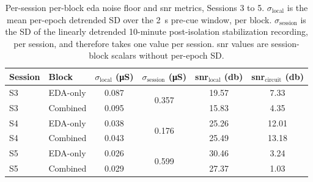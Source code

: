 \begin{table}[!htbp]
  \centering
  \caption{Per-session per-block \gls{eda} noise floor and \gls{snr} metrics, Sessions 3 to 5. $\sigma_{\text{local}}$ is the mean per-epoch detrended SD over the \SI{2}{\second} pre-cue window, per block. $\sigma_{\text{session}}$ is the SD of the linearly detrended 10-minute post-isolation stabilization recording, per session, and therefore takes one value per session. \gls{snr} values are session-block scalars without per-epoch SD.}
  \label{tab:q7-eda-noise-snr}
  \begin{tabular}{l l c c c c}
    \toprule
    \textbf{Session} & \textbf{Block} & \boldmath$\sigma_{\text{local}}$ \textbf{(\si{\micro\siemens})} & \boldmath$\sigma_{\text{session}}$ \textbf{(\si{\micro\siemens})} & \textbf{\gls{snr}$_{\text{local}}$ (\si{\decibel})} & \textbf{\gls{snr}$_{\text{circuit}}$ (\si{\decibel})} \\
    \midrule
    S3 & EDA-only & \num{0.087} & \multirow{2}{*}{\num{0.357}} & \num{19.57} & \num{7.33}  \\
    S3 & Combined & \num{0.095} &                                & \num{15.83} & \num{4.35}  \\
    \addlinespace
    S4 & EDA-only & \num{0.038} & \multirow{2}{*}{\num{0.176}} & \num{25.26} & \num{12.01} \\
    S4 & Combined & \num{0.043} &                                & \num{25.49} & \num{13.18} \\
    \addlinespace
    S5 & EDA-only & \num{0.026} & \multirow{2}{*}{\num{0.599}} & \num{30.46} & \num{3.24}  \\
    S5 & Combined & \num{0.029} &                                & \num{27.37} & \num{1.03}  \\
    \bottomrule
  \end{tabular}
\end{table}

\FloatBarrier

